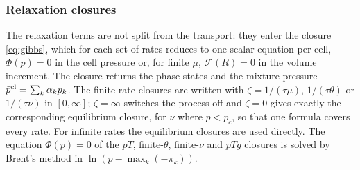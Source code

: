 \documentclass[a4paper,fleqn]{cas-sc}
\begin{document}
\subsubsection{Relaxation closures}
\label{sec:relaxation}
The relaxation terms are not split from the transport: they enter the closure \eqref{eq:gibbs}, which for each set of
rates reduces to one scalar equation per cell, $\Phi(p)=0$ in the cell pressure or, for finite $\mu$, $\mathcal F(R)=0$ in the
volume increment. The closure returns the phase states and the mixture pressure $\bar p^{\rm cl}=\sum_k\alpha_kp_k$. The finite-rate
closures are written with $\zeta=1/(\tau\mu)$, $1/(\tau\theta)$ or $1/(\tau\nu)$ in $[0,\infty]$; $\zeta=\infty$ switches the process off
and $\zeta=0$ gives exactly the corresponding equilibrium closure, for $\nu$ where $p<p_c$, so that one formula covers every
rate. For infinite rates the equilibrium closures are used directly. The equation $\Phi(p)=0$ of the $pT$, finite-$\theta$,
finite-$\nu$ and $pTg$ closures is solved by Brent's method in $\ln(p-\max_k(-\pi_k))$.
\end{document}
